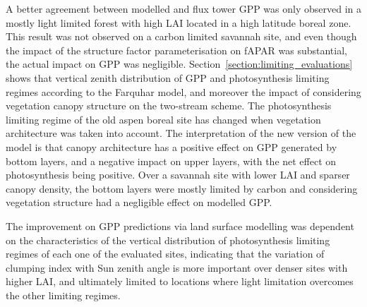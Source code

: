 \documentclass[a4paper,11pt]{report}
\begin{document}
A better agreement between modelled and flux tower GPP was only observed in a mostly light limited forest with high LAI located in a high latitude boreal zone. This result was not observed on a carbon limited savannah site, and even though the impact of the structure factor parameterisation on fAPAR was substantial, the actual impact on GPP was negligible. Section~\ref{section:limiting_evaluations} shows that vertical zenith distribution of GPP and photosynthesis limiting regimes according to the Farquhar model, and moreover the impact of considering vegetation canopy structure on the two-stream scheme. The photosynthesis limiting regime of the old aspen boreal site has changed when vegetation architecture was taken into account. The interpretation of the new version of the model is that canopy architecture has a positive effect on GPP generated by bottom layers, and a negative impact on upper layers, with the net effect on photosynthesis being positive. Over a savannah site with lower LAI and sparser canopy density, the bottom layers were mostly limited by carbon and considering vegetation structure had a negligible effect on modelled GPP. 

The improvement on GPP predictions via land surface modelling was dependent on the characteristics of the vertical distribution of photosynthesis limiting regimes of each one of the evaluated sites, indicating that the variation of clumping index with Sun zenith angle is more important over denser sites with higher LAI, and ultimately limited to locations where light limitation overcomes the other limiting regimes. 

\newpage
\pagestyle{plain}


\end{document}
